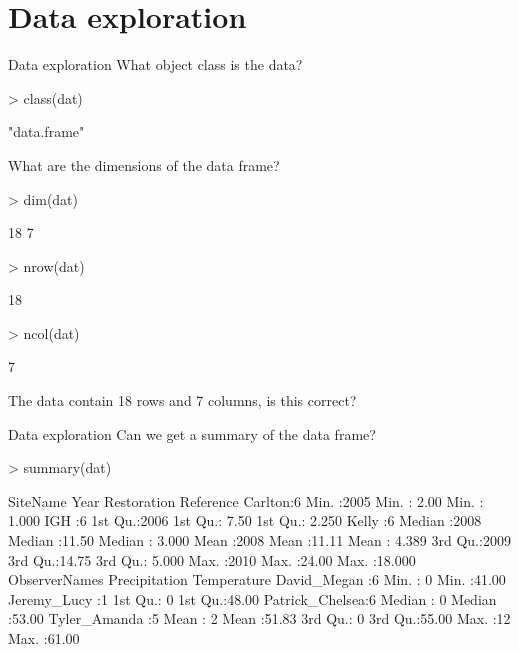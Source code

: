 \documentclass[xcolor=svgnames]{beamer}
\begin{document}
\section{Data exploration}

\begin{frame}[fragile]{Data exploration}
What object class is the data?
\begin{Schunk}
\begin{Sinput}
> class(dat)
\end{Sinput}
\begin{Soutput}
[1] "data.frame"
\end{Soutput}
\end{Schunk}
What are the dimensions of the data frame?
\begin{Schunk}
\begin{Sinput}
> dim(dat)
\end{Sinput}
\begin{Soutput}
[1] 18  7
\end{Soutput}
\begin{Sinput}
> nrow(dat)
\end{Sinput}
\begin{Soutput}
[1] 18
\end{Soutput}
\begin{Sinput}
> ncol(dat)
\end{Sinput}
\begin{Soutput}
[1] 7
\end{Soutput}
\end{Schunk}
The data contain 18 rows and 7 columns, is this correct?
\end{frame}

\begin{frame}[fragile]{Data exploration}
Can we get a summary of the data frame?
\begin{Schunk}
\begin{Sinput}
> summary(dat)
\end{Sinput}
\begin{Soutput}
    SiteName      Year       Restoration      Reference     
 Carlton:6   Min.   :2005   Min.   : 2.00   Min.   : 1.000  
 IGH    :6   1st Qu.:2006   1st Qu.: 7.50   1st Qu.: 2.250  
 Kelly  :6   Median :2008   Median :11.50   Median : 3.000  
             Mean   :2008   Mean   :11.11   Mean   : 4.389  
             3rd Qu.:2009   3rd Qu.:14.75   3rd Qu.: 5.000  
             Max.   :2010   Max.   :24.00   Max.   :18.000  
         ObserverNames Precipitation  Temperature   
 David_Megan    :6     Min.   : 0    Min.   :41.00  
 Jeremy_Lucy    :1     1st Qu.: 0    1st Qu.:48.00  
 Patrick_Chelsea:6     Median : 0    Median :53.00  
 Tyler_Amanda   :5     Mean   : 2    Mean   :51.83  
                       3rd Qu.: 0    3rd Qu.:55.00  
                       Max.   :12    Max.   :61.00  
\end{Soutput}
\end{Schunk}
\end{frame}
\end{document}
